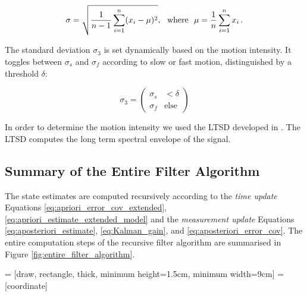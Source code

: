\begin{equation}
  \sigma = \sqrt{\frac{1}{n-1} \sum_{i=1}^n (x_i - \mu)^2}, {\rm \ \ where\ \ } \mu = \frac{1}{n} \sum_{i=1}^n x_i\,.
\end{equation}

\noindent
The standard deviation $\sigma_3$ is set dynamically based on the motion intensity. It toggles between $\sigma_s$ and $\sigma_f$ according to slow or fast motion, distinguished by a threshold $\delta$:

\begin{equation}
  \sigma_3 = \begin{pmatrix}
  	\sigma_s & < \delta\\
  	\sigma_f & \mbox{else}
  \end{pmatrix}
\end{equation}

In order to determine the motion intensity we used the \gls{LTSD} developed in \cite{olivares_vicente_gaitwatch_2013}. The \gls{LTSD} computes the long term spectral envelope of the signal.

\subsection{Summary of the Entire Filter Algorithm}

The state estimates are computed recursively according to the \emph{time update} Equations \ref{eq:apriori_error_cov_extended}, \ref{eq:apriori_estimate_extended_model} and the \emph{measurement update} Equations \ref{eq:aposteriori_estimate}, \ref{eq:Kalman_gain}, and \ref{eq:aposteriori_error_cov}. The entire computation steps of the recursive filter algorithm are summarised in Figure \ref{fig:entire_filter_algorithm}.

 = [draw, rectangle, thick, 
    minimum height=1.5cm, minimum width=9cm]
 = [coordinate]

